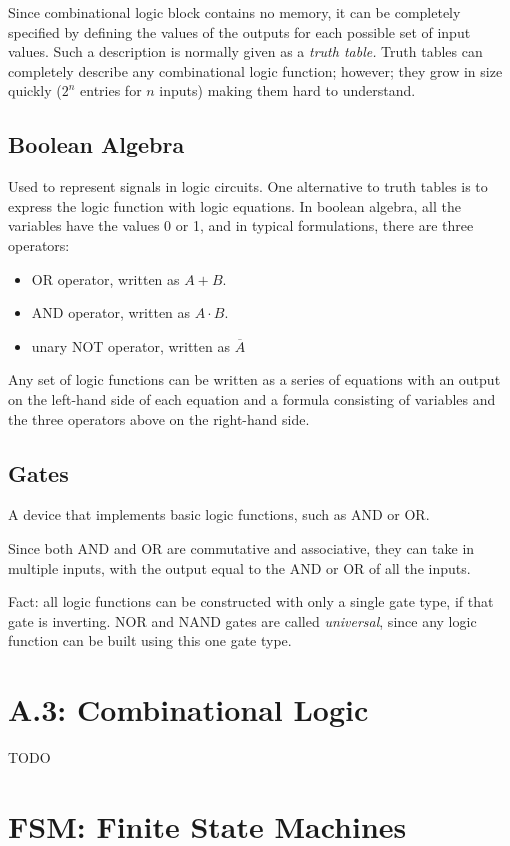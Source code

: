 \documentclass[12pt]{article}
\begin{document}
Since combinational logic block contains no memory, it can be completely specified by defining the values of the outputs for each possible set of input values. Such a description is normally given as a \emph{truth table.} Truth tables can completely describe any combinational logic function; however; they grow in size quickly ($2^n$ entries for $n$ inputs) making them hard to understand.

\subsection*{Boolean Algebra}
Used to represent signals in logic circuits. One alternative to truth tables is to express the logic function with logic equations. In boolean algebra, all the variables have the values 0 or 1, and in typical formulations, there are three operators:

\begin{itemize}
    \item OR operator, written as $A + B$.
    \item AND operator, written as $A \cdot B$.
    \item unary NOT operator, written as $\overline{A}$
\end{itemize}

Any set of logic functions can be written as a series of equations with an output on the left-hand side of each equation and a formula consisting of variables and the three operators above on the right-hand side.

\subsection*{Gates}
A device that implements basic logic functions, such as AND or OR.

Since both AND and OR are commutative and associative, they can take in multiple inputs, with the output equal to the AND or OR of all the inputs.

Fact: all logic functions can be constructed with only a single gate type, if that gate is inverting. NOR and NAND gates are called \emph{universal}, since any logic function can be built using this one gate type.

\section*{A.3: Combinational Logic}
 {\color{red} TODO}


\section*{FSM: Finite State Machines}
\end{document}
